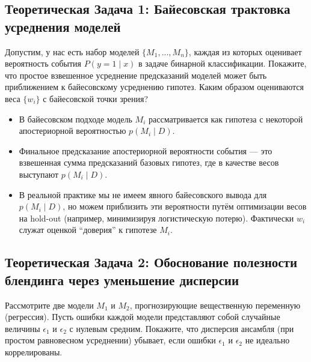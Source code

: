 \subsection{Теоретическая Задача 1: Байесовская трактовка усреднения моделей}
Допустим, у нас есть набор моделей $\{M_1, ..., M_n\}$, каждая из которых оценивает вероятность события $P(y=1 \mid x)$ в задаче бинарной классификации. Покажите, что простое взвешенное усреднение предсказаний моделей может быть приближением к байесовскому усреднению гипотез. Каким образом оцениваются веса $\{w_i\}$ с байесовской точки зрения?

\begin{itemize}
    \item В байесовском подходе модель $M_i$ рассматривается как гипотеза с некоторой апостериорной вероятностью $p(M_i \mid D)$.
    \item Финальное предсказание апостериорной вероятности события --- это взвешенная сумма предсказаний базовых гипотез, где в качестве весов выступают $p(M_i\mid D)$.
    \item В реальной практике мы не имеем явного байесовского вывода для $p(M_i\mid D)$, но можем приблизить эти вероятности путём оптимизации весов на hold-out (например, минимизируя логистическую потерю). Фактически $w_i$ служат оценкой ``доверия'' к гипотезе $M_i$.
\end{itemize}

\subsection{Теоретическая Задача 2: Обоснование полезности блендинга через уменьшение дисперсии}
Рассмотрите две модели $M_1$ и $M_2$, прогнозирующие вещественную переменную (регрессия). Пусть ошибки каждой модели представляют собой случайные величины $\epsilon_1$ и $\epsilon_2$ с нулевым средним. Покажите, что дисперсия ансамбля (при простом равновесном усреднении) убывает, если ошибки $\epsilon_1$ и $\epsilon_2$ не идеально коррелированы.

